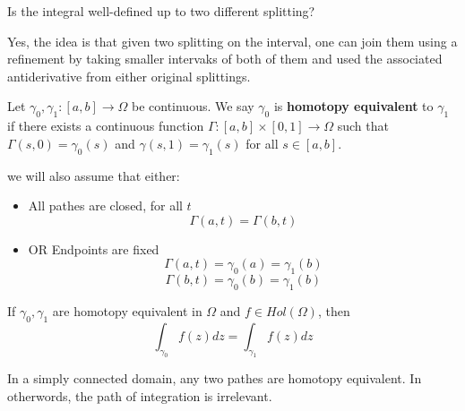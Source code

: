 \begin{question}
Is the integral well-defined up to two different splitting?
\end{question}

Yes, the idea is that given two splitting on the interval, one can join them using a refinement by taking smaller intervaks of both of them and used the associated antiderivative from either original splittings.

\begin{definition}
    Let $\gamma_0, \gamma_1: [a, b] \to \Omega$ be continuous. We say $\gamma_0$ is \textbf{homotopy equivalent} to $\gamma_1$ if there exists a continuous function $\Gamma: [a, b] \times [0, 1] \to \Omega$ such that $\Gamma(s, 0) = \gamma_0(s)$ and $\gamma(s, 1) = \gamma_1(s)$ for all $s \in [a, b]$.
\end{definition}

we will also assume that either:
        \begin{itemize}
            \item All pathes are closed, for all $t$
            \[\Gamma(a, t) = \Gamma(b, t)\]
            \item OR Endpoints are fixed
            \[\Gamma(a, t) = \gamma_0(a) = \gamma_1(b)\]
            \[\Gamma(b, t) = \gamma_0(b) = \gamma_1(b)\]
        \end{itemize}

\begin{theorem}
If $\gamma_0, \gamma_1$ are homotopy equivalent in $\Omega$ and $f \in Hol(\Omega)$, then
\[\int_{\gamma_0} f(z) dz = \int_{\gamma_1} f(z) dz\]
\end{theorem}

\begin{remark}
In a simply connected domain, any two pathes are homotopy equivalent. In otherwords, the path of integration is irrelevant.
\end{remark}